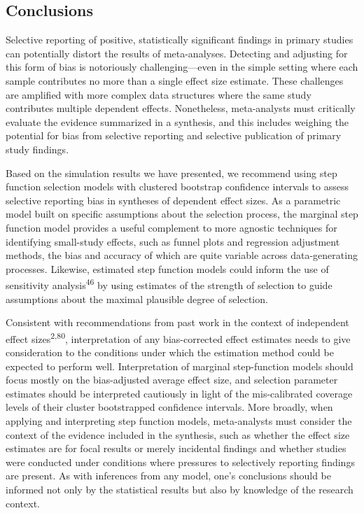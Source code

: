 \documentclass[
  american,
  man, donotrepeattitle,floatsintext]{apa7}
\begin{document}
\subsection{Conclusions}\label{conclusions}

Selective reporting of positive, statistically significant findings in primary studies can potentially distort the results of meta-analyses.
Detecting and adjusting for this form of bias is notoriously challenging---even in the simple setting where each sample contributes no more than a single effect size estimate.
These challenges are amplified with more complex data structures where the same study contributes multiple dependent effects.
Nonetheless, meta-analysts must critically evaluate the evidence summarized in a synthesis, and this includes weighing the potential for bias from selective reporting and selective publication of primary study findings.

Based on the simulation results we have presented, we recommend using step function selection models with clustered bootstrap confidence intervals to assess selective reporting bias in syntheses of dependent effect sizes. As a parametric model built on specific assumptions about the selection process, the marginal step function model provides a useful complement to more agnostic techniques for identifying small-study effects, such as funnel plots and regression adjustment methods, the bias and accuracy of which are quite variable across data-generating processes. Likewise, estimated step function models could inform the use of sensitivity analysis\textsuperscript{46} by using estimates of the strength of selection to guide assumptions about the maximal plausible degree of selection.

Consistent with recommendations from past work in the context of independent effect sizes\textsuperscript{2,80}, interpretation of any bias-corrected effect estimates needs to give consideration to the conditions under which the estimation method could be expected to perform well.
Interpretation of marginal step-function models should focus mostly on the bias-adjusted average effect size, and selection parameter estimates should be interpreted cautiously in light of the mis-calibrated coverage levels of their cluster bootstrapped confidence intervals.
More broadly, when applying and interpreting step function models, meta-analysts must consider the context of the evidence included in the synthesis, such as whether the effect size estimates are for focal results or merely incidental findings and whether studies were conducted under conditions where pressures to selectively reporting findings are present.
As with inferences from any model, one's conclusions should be informed not only by the statistical results but also by knowledge of the research context.
\end{document}
